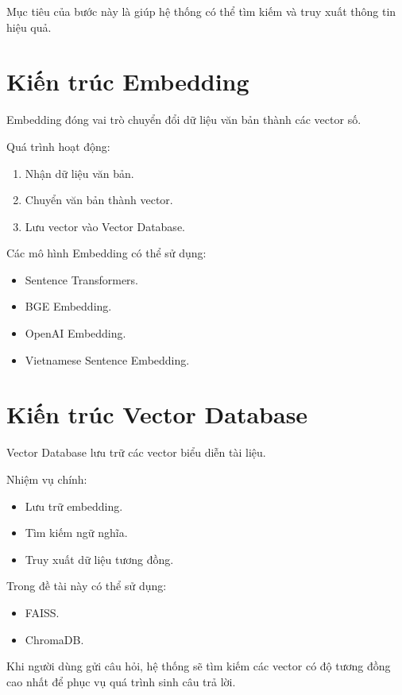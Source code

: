 \documentclass[12pt,a4paper]{report}
\begin{document}
	Mục tiêu của bước này là giúp hệ thống có thể tìm kiếm và truy xuất thông tin hiệu quả.
	
	\section{Kiến trúc Embedding}
	
	Embedding đóng vai trò chuyển đổi dữ liệu văn bản thành các vector số.
	
	Quá trình hoạt động:
	
	\begin{enumerate}
		\item Nhận dữ liệu văn bản.
		\item Chuyển văn bản thành vector.
		\item Lưu vector vào Vector Database.
	\end{enumerate}
	
	Các mô hình Embedding có thể sử dụng:
	
	\begin{itemize}
		\item Sentence Transformers.
		\item BGE Embedding.
		\item OpenAI Embedding.
		\item Vietnamese Sentence Embedding.
	\end{itemize}
	
	\section{Kiến trúc Vector Database}
	
	Vector Database lưu trữ các vector biểu diễn tài liệu.
	
	Nhiệm vụ chính:
	
	\begin{itemize}
		\item Lưu trữ embedding.
		\item Tìm kiếm ngữ nghĩa.
		\item Truy xuất dữ liệu tương đồng.
	\end{itemize}
	
	Trong đề tài này có thể sử dụng:
	
	\begin{itemize}
		\item FAISS.
		\item ChromaDB.
	\end{itemize}
	
	Khi người dùng gửi câu hỏi, hệ thống sẽ tìm kiếm các vector có độ tương đồng cao nhất để phục vụ quá trình sinh câu trả lời.
	
\end{document}
